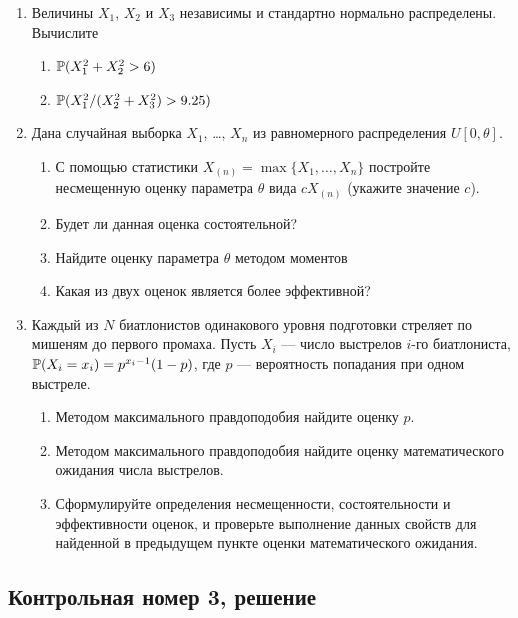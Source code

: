 \documentclass[12pt, a4paper]{article}\usepackage[]{graphicx}\usepackage[]{color}
\begin{document}
\begin{enumerate}
\item Величины $X_1$, $X_2$ и $X_3$  независимы и стандартно нормально распределены. Вычислите
\begin{enumerate}
\item $\P(X_1^2 + X_2^2 > 6)$
\item $\P(X_1^2 / (X_2^2 + X_3^2) > 9.25 )$
\end{enumerate}

\item Дана случайная выборка $X_1$, \ldots, $X_n$ из равномерного распределения $U[0, \theta]$.
\begin{enumerate}
\item  С помощью статистики $X_{(n)}=\max\{X_1, \ldots, X_n \}$ постройте несмещенную оценку параметра $\theta$  вида $cX_{(n)}$ (укажите значение $c$).
\item Будет ли данная оценка состоятельной?
\item Найдите оценку параметра $\theta$ методом моментов
\item Какая из двух оценок является более эффективной?
\end{enumerate}

\item Каждый из $N$ биатлонистов одинакового уровня подготовки стреляет по мишеням до первого промаха.  Пусть $X_i$ — число выстрелов $i$-го биатлониста, $\P(X_i = x_i)=p^{x_i-1}(1-p)$, где $p$ — вероятность попадания при одном выстреле.
\begin{enumerate}
\item Методом максимального правдоподобия найдите оценку $p$.
\item Методом максимального правдоподобия найдите оценку математического ожидания числа выстрелов.
\item Сформулируйте определения несмещенности, состоятельности и эффективности  оценок, и проверьте выполнение данных свойств для найденной в предыдущем пункте оценки математического ожидания.
\end{enumerate}


\end{enumerate}


\subsection{Контрольная номер 3, решение}
\end{document}
